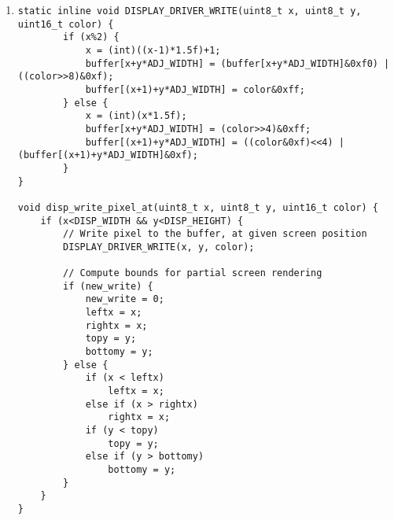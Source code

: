 \begin{enumerate}[label=\textbf{S.\arabic*},ref=S.\arabic*{ of Appendix A}]
\begin{adjustwidth}{-2em}{0pt}
\begin{lstlisting}
    *xret = DISP_GRAPH_X + GRAPH_WIDTH-(GRAPH_WIDTH%BAR_WIDTH)-data_length*BAR_WIDTH;
    *widthret = GRAPH_WIDTH-(GRAPH_WIDTH%BAR_WIDTH);
    for (x=*xret-DISP_GRAPH_X, i=0; i<*widthret; i++, x++) {
        if ((i/BAR_WIDTH)>=data_length) {
            *widthret = i;
            break;
        }
        for (y=0; y<bar[i/BAR_WIDTH]; y++) {
            index = (data_start+i/BAR_WIDTH)%data_length;
            // Color the pixels based on glucose level (whether too high or too low)
            if (data[index]>=DISP_DANGER_HIGH)
                GRAPH_PIXEL_DANGER(x, y);
            else if (data[index]>=DISP_WARNING_HIGH)
                GRAPH_PIXEL_WARNING(x, y);
            else if (data[index]<=DISP_DANGER_LOW)
                GRAPH_PIXEL_DANGER(x, y);
            else if (data[index]<=DISP_WARNING_LOW)
                GRAPH_PIXEL_WARNING(x, y);
            else
                GRAPH_PIXEL_ON(x, y);
        }
        if (bar[i/BAR_WIDTH] > (*heightret))
            *heightret = bar[i/BAR_WIDTH];
    }

    *yret = DISP_GRAPH_Y+DISP_GRAPH_HEIGHT-1-*heightret;
    *heightret = *heightret + 1;
    is_changed = 0;
}
\end{lstlisting}
\end{adjustwidth}
\doublespacing

\item \label{disp_write_pixel_at}
\begin{adjustwidth}{-2em}{0pt}
\singlespacing
\nl
\begin{lstlisting}
static inline void DISPLAY_DRIVER_WRITE(uint8_t x, uint8_t y, uint16_t color) {
        if (x%2) {
            x = (int)((x-1)*1.5f)+1;
            buffer[x+y*ADJ_WIDTH] = (buffer[x+y*ADJ_WIDTH]&0xf0) | ((color>>8)&0xf);
            buffer[(x+1)+y*ADJ_WIDTH] = color&0xff;
        } else {
            x = (int)(x*1.5f);
            buffer[x+y*ADJ_WIDTH] = (color>>4)&0xff;
            buffer[(x+1)+y*ADJ_WIDTH] = ((color&0xf)<<4) | (buffer[(x+1)+y*ADJ_WIDTH]&0xf);
        }
}

void disp_write_pixel_at(uint8_t x, uint8_t y, uint16_t color) {
    if (x<DISP_WIDTH && y<DISP_HEIGHT) {
        // Write pixel to the buffer, at given screen position
        DISPLAY_DRIVER_WRITE(x, y, color);

        // Compute bounds for partial screen rendering
        if (new_write) {
            new_write = 0;
            leftx = x;
            rightx = x;
            topy = y;
            bottomy = y;
        } else {
            if (x < leftx)
                leftx = x;
            else if (x > rightx)
                rightx = x;
            if (y < topy)
                topy = y;
            else if (y > bottomy)
                bottomy = y;
        }
    }
}
\end{lstlisting}
\end{adjustwidth}
\doublespacing


\end{enumerate}
